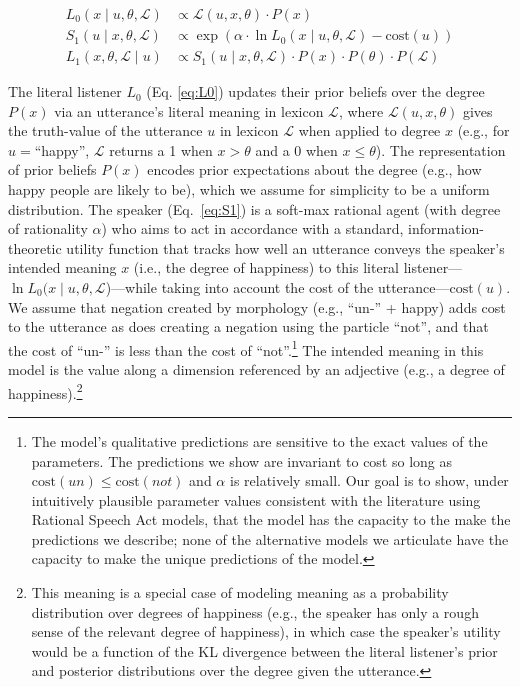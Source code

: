 \documentclass[floatsintext,doc]{apa6}
\let\rmarkdownfootnote\footnote%
\def\footnote{\protect\rmarkdownfootnote}
\begin{document}
\begin{align}
L_{0}(x \mid u, \theta, \mathcal{L}) &\propto \mathcal{L}(u, x, \theta) \cdot P(x) \label{eq:L0} \\
S_{1}(u \mid x, \theta, \mathcal{L}) &\propto \exp{(\alpha \cdot \ln {L_{0}(x \mid u, \theta, \mathcal{L})} - \text{cost}(u))} \label{eq:S1}\\
L_{1}(x, \theta, \mathcal{L} \mid u) &\propto S_{1}(u \mid x, \theta, \mathcal{L}) \cdot P(x) \cdot  P(\theta) \cdot P(\mathcal{L}) \label{eq:L1}
\end{align}

The literal listener \(L_0\) (Eq. \ref{eq:L0}) updates their prior beliefs over the degree \(P(x)\) via an utterance's literal meaning in lexicon \(\mathcal{L}\),
where \(\mathcal{L}(u, x, \theta)\) gives the truth-value of the utterance \(u\) in lexicon \(\mathcal{L}\) when applied to degree \(x\) (e.g., for $u= $\enquote{happy}, $\mathcal{L}$ returns a 1 when $x>\theta$ and a 0 when  $x\leq\theta$).
The representation of prior beliefs $P(x)$ encodes prior expectations about the degree (e.g., how happy people are likely to be), which we assume for simplicity to be a uniform distribution. 
The speaker (Eq.~\ref{eq:S1}) is a soft-max rational agent (with degree of rationality  $\alpha$) who aims to act in accordance with a standard, information-theoretic utility function that tracks how well an utterance conveys the speaker's intended meaning $x$ (i.e., the degree of happiness) to this literal listener---$\ln {L_{0}(x \mid u, \theta, \mathcal{L}}$)---while taking into account the cost of the utterance---$\text{cost}(u)$.
We assume that negation created by morphology (e.g., ``un-'' + happy) adds cost to the utterance as does creating a negation using the particle ``not'', and that the cost of ``un-'' is less than the cost of ``not''.\footnote{The \ourmodel model's qualitative predictions are sensitive to the exact values of the parameters. The predictions we show are invariant to cost so long as $\text{cost}(un) \leq \text{cost}(not)$ and $\alpha$ is relatively small. Our goal is to show, under intuitively plausible parameter values consistent with the literature using Rational Speech Act models, that the \ourmodel model has the capacity to the make the predictions we describe; none of the alternative models we articulate have the capacity to make the unique predictions of the \ourmodel model.}
The intended meaning in this model is the value along a dimension referenced by an adjective (e.g., a degree of happiness).\footnote{
	This meaning is a special case of modeling meaning as a probability distribution over degrees of happiness (e.g., the speaker has only a rough sense of the relevant degree of happiness), in which case the speaker's utility would be a function of the KL divergence between the literal listener's prior and posterior distributions over the degree given the utterance. 
}
\end{document}
